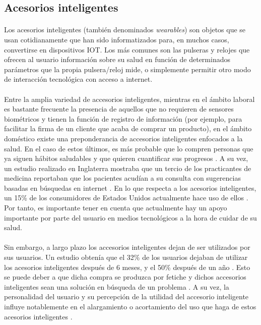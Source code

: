 \subsection{Acesorios inteligentes}
\paragraph{}
Los acesorios inteligentes (también denominados \textit{wearables}) son objetos que se usan cotidianamente que han sido informatizados para, en muchos casos, convertirse en dispositivos IOT. Los más comunes son las pulseras y relojes que ofrecen al usuario información sobre su salud en función de determinados parámetros que la propia pulsera/reloj mide, o simplemente permitir otro modo de interacción tecnológica con acceso a internet.

\paragraph{}
Entre la amplia variedad de accesorios inteligentes, mientras en el ámbito laboral es bastante frecuente la presencia de aquellos que no requieren de sensores biométricos y tienen la función de registro de información (por ejemplo, para facilitar la firma de un cliente que acaba de comprar un producto), en el ámbito doméstico existe una preponderancia de accesorios inteligentes enfocados a la salud. En  el caso de estos últimos, es más probable que lo compren personas que ya siguen hábitos saludables y que quieren cuantificar sus progresos \citep{bhas2013smart}. A su vez, un estudio realizado en Inglaterra mostraba que un tercio de los practicantes de medicina reportaban que los pacientes acudían a su consulta con sugerencias basadas en búsquedas en internet \citep{cello}. En lo que respecta a los acesorios inteligentes, un 15\% de los consumidores de Estados Unidos actualmente hace uso de ellos \citep{piwek2016rise}. Por tanto, es importante tener en cuenta que actualmente hay un apoyo importante por parte del usuario en medios tecnológicos a la hora de cuidar de su salud.

\paragraph{}
Sin embargo, a largo plazo los accesorios inteligentes dejan de ser utilizados por sus usuarios. Un estudio obtenía que el 32\% de los usuarios dejaban de utilizar los acesorios inteligentes después de 6 meses, y el 50\% después de un año \citep{ledger2014inside}. Esto se puede deber a que dicha compra se produzca por fetiche y dichos accesorios inteligentes sean una solución en búsqueda de un problema \citep{piwek2016rise}. A su vez, la personalidad del usuario y su percepción de la utilidad del accesorio inteligente influye notablemente en el alargamiento o acortamiento del uso que haga de estos acesorios inteligentes \citep{ehrenberg2008personality}.

